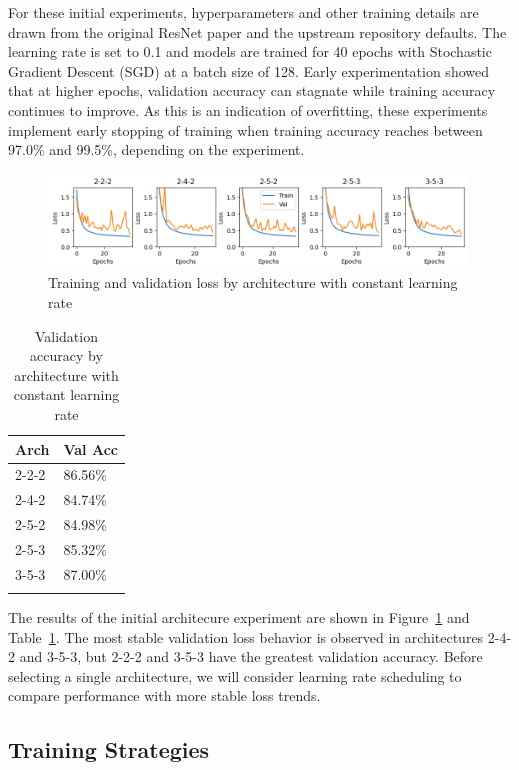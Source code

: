 \documentclass[letterpaper]{article} %
\begin{document}
For these initial experiments, hyperparameters and other training details are drawn from the original ResNet paper and
the upstream repository defaults.
The learning rate is set to 0.1 and models are trained for 40 epochs with Stochastic Gradient Descent (SGD) at a batch
size of 128.
Early experimentation showed that at higher epochs, validation accuracy can stagnate while training accuracy continues
to improve.
As this is an indication of overfitting, these experiments implement early stopping of training when
training accuracy reaches between 97.0\% and 99.5\%, depending on the experiment.

\begin{figure}[t]
\centering
\includegraphics[width=0.99\textwidth]{loss-curves-5}
\caption{Training and validation loss by architecture with constant learning rate}
\label{fig2}
\end{figure}

\begin{table}[t]
\centering
\begin{tabular}{|l|l|}
    \firsthline
    Arch & Val Acc    \\
    \hline
    2-2-2 & 86.56\%    \\
    2-4-2 & 84.74\%    \\
    2-5-2 & 84.98\%    \\
    2-5-3 & 85.32\%    \\
    3-5-3 & 87.00\%    \\
    \lasthline
\end{tabular}
\caption{Validation accuracy by architecture with constant learning rate}
\label{table1}
\end{table}

The results of the initial architecure experiment are shown in Figure~\ref{fig2} and Table~\ref{table1}.
The most stable validation loss behavior is observed in architectures 2-4-2 and 3-5-3, but 2-2-2 and 3-5-3
have the greatest validation accuracy.
Before selecting a single architecture, we will consider learning rate scheduling to compare performance
with more stable loss trends.

\subsection{Training Strategies}
\end{document}
